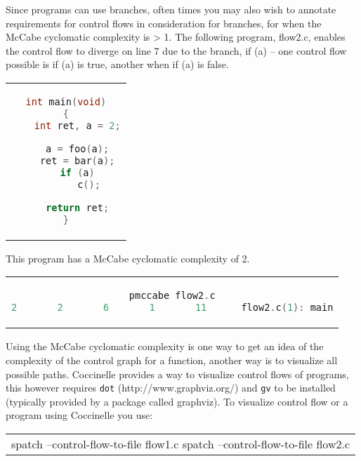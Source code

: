 Since programs can use branches, often times you may also wish to annotate
requirements for control flows in consideration for branches, for when
the McCabe cyclomatic complexity is > 1. The following program, flow2.c,
enables the control flow to diverge on line 7 due to the branch, if (a) --
one control flow possible is if (a) is true, another when if (a) is false.

\begin{center}
\begin{tabular}{c}
\begin{lstlisting}[language=C]
int main(void)
{
	int ret, a = 2;

	a = foo(a);
	ret = bar(a);
	if (a)
		c();

	return ret;
}
\end{lstlisting}\\
\end{tabular}
\end{center}

This program has a McCabe cyclomatic complexity of 2.

\begin{center}
\begin{tabular}{c}
\begin{lstlisting}[language=C]
pmccabe flow2.c
2       2       6       1       11      flow2.c(1): main
\end{lstlisting}\\
\end{tabular}
\end{center}

Using the McCabe cyclomatic complexity is one way to get an idea of
the complexity of the control graph for a function, another way is
to visualize all possible paths. Coccinelle provides a way to visualize
control flows of programs, this however requires {\tt dot}
(http://www.graphviz.org/) and {\tt gv} to be installed (typically provided
by a package called graphviz). To visualize control flow or a program
using Coccinelle you use:

\begin{center}
\begin{tabular}{c}
spatch --control-flow-to-file flow1.c
spatch --control-flow-to-file flow2.c
\end{tabular}
\end{center}




